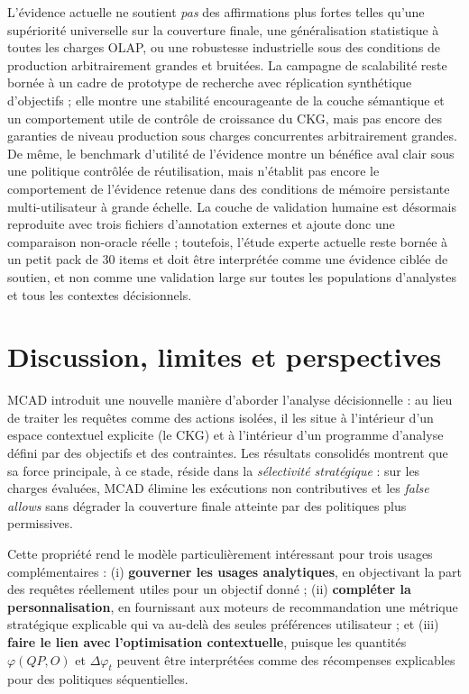 \documentclass[journal]{IEEEtran}
\begin{document}
L'évidence actuelle ne soutient \emph{pas} des affirmations plus fortes telles qu'une supériorité universelle sur la couverture finale, une généralisation statistique à toutes les charges OLAP, ou une robustesse industrielle sous des conditions de production arbitrairement grandes et bruitées. La campagne de scalabilité reste bornée à un cadre de prototype de recherche avec réplication synthétique d'objectifs ; elle montre une stabilité encourageante de la couche sémantique et un comportement utile de contrôle de croissance du CKG, mais pas encore des garanties de niveau production sous charges concurrentes arbitrairement grandes. De même, le benchmark d'utilité de l'évidence montre un bénéfice aval clair sous une politique contrôlée de réutilisation, mais n'établit pas encore le comportement de l'évidence retenue dans des conditions de mémoire persistante multi-utilisateur à grande échelle. La couche de validation humaine est désormais reproduite avec trois fichiers d'annotation externes et ajoute donc une comparaison non-oracle réelle ; toutefois, l'étude experte actuelle reste bornée à un petit pack de 30 items et doit être interprétée comme une évidence ciblée de soutien, et non comme une validation large sur toutes les populations d'analystes et tous les contextes décisionnels.

\section{Discussion, limites et perspectives}
\label{sec:disc}

MCAD introduit une nouvelle manière d'aborder l'analyse décisionnelle : au lieu de traiter les requêtes comme des actions isolées, il les situe à l'intérieur d'un espace contextuel explicite (le CKG) et à l'intérieur d'un programme d'analyse défini par des objectifs et des contraintes. Les résultats consolidés montrent que sa force principale, à ce stade, réside dans la \emph{sélectivité stratégique} : sur les charges évaluées, MCAD élimine les exécutions non contributives et les \emph{false allows} sans dégrader la couverture finale atteinte par des politiques plus permissives.

Cette propriété rend le modèle particulièrement intéressant pour trois usages complémentaires : (i) \textbf{gouverner les usages analytiques}, en objectivant la part des requêtes réellement utiles pour un objectif donné ; (ii) \textbf{compléter la personnalisation}, en fournissant aux moteurs de recommandation une métrique stratégique explicable qui va au-delà des seules préférences utilisateur ; et (iii) \textbf{faire le lien avec l'optimisation contextuelle}, puisque les quantités $\varphi(QP,O)$ et $\Delta\varphi_t$ peuvent être interprétées comme des récompenses explicables pour des politiques séquentielles.
\end{document}
